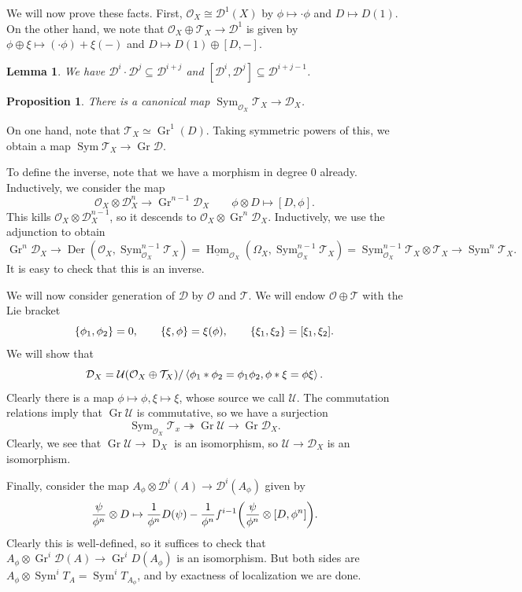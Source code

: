 \documentclass[leqno, openany]{memoir}
\newtheorem{prop}[thm]{Proposition}
\newtheorem{lem}[thm]{Lemma}
\theoremstyle{definition}
\theoremstyle{remark}
\theoremstyle{plain}
\theoremstyle{definition}
\theoremstyle{remark}
\newcommand{\mc}[1]{\mathcal{#1}}
\newcommand{\on}[1]{\operatorname{#1}}
\newcommand{\ul}[1]{\underline{#1}}
\DeclareMathOperator{\Der}{Der}
\DeclareMathOperator{\Hom}{Hom}
\begin{document}
We will now prove these facts. First, $\mc{O}_X \cong \mc{D}^1(X)$ by $\phi \mapsto \cdot \phi$ and $D \mapsto D(1)$. On the other hand, we note that $\mc{O}_X \oplus \mc{T}_X \to \mc{D}^1$ is given by $\phi \oplus \xi \mapsto (\cdot \phi) + \xi(-)$ and $D \mapsto D(1) \oplus [D,-]$.

\begin{lem}
    We have $\mc{D}^i \cdot \mc{D}^j \subseteq \mc{D}^{i+j}$ and $[\mc{D}^i, \mc{D}^j] \subseteq \mc{D}^{i+j-1}$.
\end{lem}

\begin{prop}
    There is a canonical map $\on{Sym}_{\mc{O}_X} \mc{T}_X \to \mc{D}_X$.
\end{prop}

On one hand, note that $\mc{T}_X \simeq \on{Gr}^1(D)$. Taking symmetric powers of this, we obtain a map $\on{Sym} \mc{T}_X \to \on{Gr} \mc{D}$.

To define the inverse, note that we have a morphism in degree $0$ already. Inductively, we consider the map
\[ \mc{O}_X \otimes \mc{D}^n_X \to \on{Gr}^{n-1} \mc{D}_X \qquad \phi \otimes D \mapsto [D, \phi]. \]
This kills $\mc{O}_X \otimes \mc{D}^{n-1}_X$, so it descends to $\mc{O}_X \otimes \on{Gr}^n \mc{D}_X$. Inductively, we use the adjunction to obtain
\[ \on{Gr}^n \mc{D}_X \to \Der(\mc{O}_X, \on{Sym}_{\mc{O}_X}^{n-1} \mc{T}_X) = \ul{\Hom}_{\mc{O}_X}(\Omega_X, \on{Sym}^{n-1}_{\mc{O}_X} \mc{T}_X) = \on{Sym}^{n-1}_{\mc{O}_X} \mc{T}_X \otimes \mc{T}_X \to \on{Sym}^n \mc{T}_X. \]
It is easy to check that this is an inverse.

We will now consider generation of $\mc{D}$ by $\mc{O}$ and $\mc{T}$. We will endow $\mc{O} \oplus \mc{T}$ with the Lie bracket 
\[ \qty{\phi_1, \phi_2} = 0, \qquad \qty{\xi, \phi} = \xi(\phi), \qquad \qty{\xi_1, \xi_2} = [\xi_1, \xi_2]. \]
We will show that
\[ \mc{D}_X = \mc{U}(\mc{O}_X \oplus \mc{T}_X) / \ev{\phi_1 * \phi_2 = \phi_1 \phi_2, \phi * \xi = \phi \xi}. \]
Clearly there is a map $\phi \mapsto \phi, \xi \mapsto \xi$, whose source we call $\mc{U}$. The commutation relations imply that $\on{Gr} \mc{U}$ is commutative, so we have a surjection
\[ \on{Sym}_{\mc{O}_X} \mc{T}_x \twoheadrightarrow \on{Gr} \mc{U} \to \on{Gr} \mc{D}_X. \]
Clearly, we see that $\on{Gr} \mc{U} \to \on{D}_X$ is an isomorphism, so $\mc{U} \to \mc{D}_X$ is an isomorphism.

Finally, consider the map $A_{\phi} \otimes \mc{D}^i(A) \to \mc{D}^i(A_{\phi})$ given by
\[ \frac{\psi}{\phi^n} \otimes D \mapsto \frac{1}{\phi^n} D(\psi) - \frac{1}{\phi^n} f^{i-1} \qty(\frac{\psi}{\phi^n} \otimes [D, \phi^n]). \]
Clearly this is well-defined, so it suffices to check that $A_{\phi} \otimes \on{Gr}^i \mc{D}(A) \to \on{Gr}^i D(A_{\phi})$ is an isomorphism. But both sides are $A_{\phi} \otimes \on{Sym}^i T_A = \on{Sym}^i T_{A_{\phi}}$, and by exactness of localization we are done.
\end{document}
